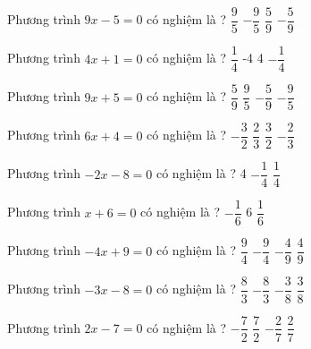 \begin{ex} 
	Phương trình $9x-5=0$ có nghiệm là ? 
	\choice
	{$ \dfrac{ 9 }{ 5 } $}
	{$- \dfrac{ 9 }{ 5 } $}
	{\True $ \dfrac{ 5 }{ 9 } $}
	{$- \dfrac{ 5 }{ 9 } $}
	\loigiai{} 
\end{ex}

\begin{ex} 
	Phương trình $4x+1=0$ có nghiệm là ? 
	\choice
	{$ \dfrac{ 1 }{ 4 } $}
	{-4}
	{4}
	{\True $- \dfrac{ 1 }{ 4 } $}
	\loigiai{} 
\end{ex}

\begin{ex} 
	Phương trình $9x+5=0$ có nghiệm là ? 
	\choice
	{$ \dfrac{ 5 }{ 9 } $}
	{$ \dfrac{ 9 }{ 5 } $}
	{\True $- \dfrac{ 5 }{ 9 } $}
	{$- \dfrac{ 9 }{ 5 } $}
	\loigiai{} 
\end{ex}

\begin{ex} 
	Phương trình $6x+4=0$ có nghiệm là ? 
	\choice
	{$- \dfrac{ 3 }{ 2 } $}
	{$ \dfrac{ 2 }{ 3 } $}
	{$ \dfrac{ 3 }{ 2 } $}
	{\True $- \dfrac{ 2 }{ 3 } $}
	\loigiai{} 
\end{ex}

\begin{ex} 
	Phương trình $-2x-8=0$ có nghiệm là ? 
	\choice
	{4}
	{$- \dfrac{ 1 }{ 4 } $}
	{$ \dfrac{ 1 }{ 4 } $}
	{}
	\loigiai{} 
\end{ex}

\begin{ex} 
	Phương trình $x+6=0$ có nghiệm là ? 
	\choice
	{$- \dfrac{ 1 }{ 6 } $}
	{}
	{6}
	{$ \dfrac{ 1 }{ 6 } $}
	\loigiai{} 
\end{ex}

\begin{ex} 
	Phương trình $-4x+9=0$ có nghiệm là ? 
	\choice
	{\True $ \dfrac{ 9 }{ 4 } $}
	{$- \dfrac{ 9 }{ 4 } $}
	{$- \dfrac{ 4 }{ 9 } $}
	{$ \dfrac{ 4 }{ 9 } $}
	\loigiai{} 
\end{ex}

\begin{ex} 
	Phương trình $-3x-8=0$ có nghiệm là ? 
	\choice
	{$ \dfrac{ 8 }{ 3 } $}
	{\True $- \dfrac{ 8 }{ 3 } $}
	{$- \dfrac{ 3 }{ 8 } $}
	{$ \dfrac{ 3 }{ 8 } $}
	\loigiai{} 
\end{ex}

\begin{ex} 
	Phương trình $2x-7=0$ có nghiệm là ? 
	\choice
	{$- \dfrac{ 7 }{ 2 } $}
	{\True $ \dfrac{ 7 }{ 2 } $}
	{$- \dfrac{ 2 }{ 7 } $}
	{$ \dfrac{ 2 }{ 7 } $}
	\loigiai{} 
\end{ex}

